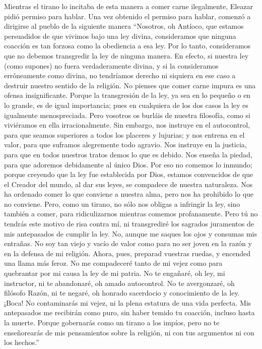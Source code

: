  Mientras el tirano lo incitaba de esta manera a comer
carne ilegalmente, Eleazar pidió permiso para hablar. 
Una vez obtenido el permiso para hablar, comenzó a dirigirse al pueblo
de la siguiente manera  ``Nosotros, oh Antíoco, que
estamos persuadidos de que vivimos bajo una ley divina, consideramos que
ninguna coacción es tan forzosa como la obediencia a esa ley.
 Por lo tanto, consideramos que no debemos transgredir la
ley de ninguna manera.  En efecto, si nuestra ley (como
supones) no fuera verdaderamente divina, y si la consideramos
erróneamente como divina, no tendríamos derecho ni siquiera en ese caso
a destruir nuestro sentido de la religión.  No pienses
que comer carne impura es una ofensa insignificante. 
Porque la transgresión de la ley, ya sea en lo pequeño o en lo grande,
es de igual importancia;  pues en cualquiera de los dos
casos la ley es igualmente menospreciada.  Pero vosotros
os burláis de nuestra filosofía, como si viviéramos en ella
irracionalmente.  Sin embargo, nos instruye en el
autocontrol, para que seamos superiores a todos los placeres y lujurias;
y nos entrena en el valor, para que suframos alegremente todo agravio.
 Nos instruye en la justicia, para que en todos nuestros
tratos demos lo que es debido. Nos enseña la piedad, para que adoremos
debidamente al único Dios.  Por eso no comemos lo
inmundo; porque creyendo que la ley fue establecida por Dios, estamos
convencidos de que el Creador del mundo, al dar sus leyes, se compadece
de nuestra naturaleza.  Nos ha ordenado comer lo que
conviene a nuestra alma, pero nos ha prohibido lo que no conviene.
 Pero, como un tirano, no sólo nos obligas a infringir la
ley, sino también a comer, para ridiculizarnos mientras comemos
profanamente.  Pero tú no tendrás este motivo de risa
contra mí,  ni transgrediré los sagrados juramentos de
mis antepasados de cumplir la ley.  No, aunque me saques
los ojos y consumas mis entrañas.  No soy tan viejo y
vacío de valor como para no ser joven en la razón y en la defensa de mi
religión.  Ahora, pues, preparad vuestras ruedas, y
encended una llama más feroz.  No me compadeceré tanto de
mi vejez como para quebrantar por mi causa la ley de mi patria.
 No te engañaré, oh ley, mi instructor, ni te abandonaré,
oh amado autocontrol.  No te avergonzaré, oh filósofo
Razón, ni te negaré, oh honrado sacerdocio y conocimiento de la ley.
 ¡Boca! No contaminarás mi vejez, ni la plena estatura de
una vida perfecta.  Mis antepasados me recibirán como
puro, sin haber temido tu coacción, incluso hasta la muerte.
 Porque gobernarás como un tirano a los impíos, pero no
te enseñorearás de mis pensamientos sobre la religión, ni con tus
argumentos ni con los hechos.''

